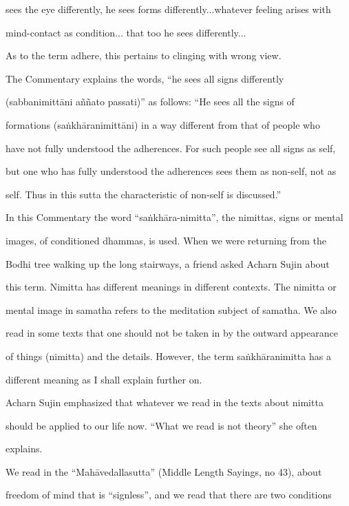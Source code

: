       sees the eye differently, he sees forms differently...whatever feeling arises with  

      mind-contact as condition... that too he sees differently... 



As to the term adhere, this pertains to clinging with wrong view. 

   The   Commentary   explains   the   words,   “he   sees   all   signs   differently  

(sabbanimittāni   aññato   passati)”   as   follows:   “He   sees   all   the   signs   of  

formations  (saṅkhāranimittāni)  in  a way   different  from  that  of  people who  

have not fully understood the adherences. For such people see all signs as self,  

but one who has fully understood the adherences sees them as non-self, not as  

self. Thus in this sutta the characteristic of non-self is discussed.” 



In this Commentary the word “saṅkhāra-nimitta”, the nimittas, signs or mental  

images, of conditioned dhammas, is used. When we were returning from the  

Bodhi tree walking up the long  stairways,  a friend  asked Acharn  Sujin  about  

this term. Nimitta has different meanings in different contexts. The nimitta or  

mental image in samatha refers to the meditation subject of samatha. We also  

read in some texts that one should not be taken in by the outward appearance  

of things  (nimitta)  and the details. However, the term saṅkhāranimitta has a  

different meaning as I shall explain further on. 

   Acharn  Sujin emphasized that whatever we read in the texts about nimitta  

should  be  applied  to  our  life  now.  “What we  read  is  not  theory”  she  often  

explains. 



We   read  in  the  “Mahāvedallasutta”  (Middle  Length  Sayings,  no  43),  about  

freedom of mind that is “signless”, and we read that there are two conditions  

